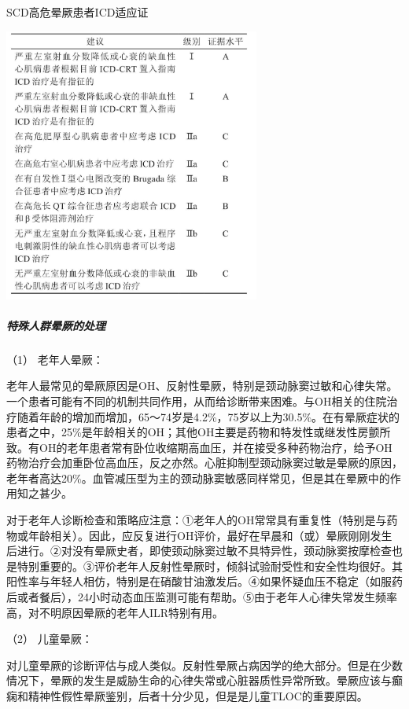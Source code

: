 \begin{table}[htbp]
\centering
\caption{SCD高危晕厥患者ICD适应证}
\label{tab4-14}
\includegraphics[width=3.3125in,height=3.55208in]{./images/Image00032.jpg}
\end{table}

\subparagraph{特殊人群晕厥的处理}

\hypertarget{text00014.htmlux5cux23CHP1-4-4-1-5-1}{}
（1） 老年人晕厥：

老年人最常见的晕厥原因是OH、反射性晕厥，特别是颈动脉窦过敏和心律失常。一个患者可能有不同的机制共同作用，从而给诊断带来困难。与OH相关的住院治疗随着年龄的增加而增加，65～74岁是4.2\%，75岁以上为30.5\%。在有晕厥症状的患者之中，25\%是年龄相关的OH；其他OH主要是药物和特发性或继发性房颤所致。有OH的老年患者常有卧位收缩期高血压，并在接受多种药物治疗，给予OH药物治疗会加重卧位高血压，反之亦然。心脏抑制型颈动脉窦过敏是晕厥的原因，老年者高达20\%。血管减压型为主的颈动脉窦敏感同样常见，但是其在晕厥中的作用知之甚少。

对于老年人诊断检查和策略应注意：①老年人的OH常常具有重复性（特别是与药物或年龄相关）。因此，应反复进行OH评价，最好在早晨和（或）晕厥刚刚发生后进行。②对没有晕厥史者，即使颈动脉窦过敏不具特异性，颈动脉窦按摩检查也是特别重要的。③评价老年人反射性晕厥时，倾斜试验耐受性和安全性均很好。其阳性率与年轻人相仿，特别是在硝酸甘油激发后。④如果怀疑血压不稳定（如服药后或者餐后），24小时动态血压监测可能有帮助。⑤由于老年人心律失常发生频率高，对不明原因晕厥的老年人ILR特别有用。

\hypertarget{text00014.htmlux5cux23CHP1-4-4-1-5-2}{}
（2） 儿童晕厥：

对儿童晕厥的诊断评估与成人类似。反射性晕厥占病因学的绝大部分。但是在少数情况下，晕厥的发生是威胁生命的心律失常或心脏器质性异常所致。晕厥应该与癫痫和精神性假性晕厥鉴别，后者十分少见，但是是儿童TLOC的重要原因。

